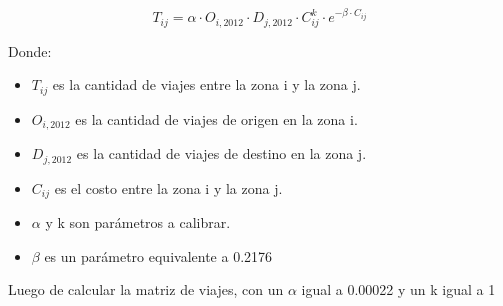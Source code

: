 \documentclass[letterpaper,12pt]{article}
\begin{document}
\begin{equation}
    T_{ij} = \alpha \cdot O_{i,2012} \cdot D_{j,2012} \cdot C_{ij}^k \cdot e^{-\beta \cdot C_{ij}}
\end{equation}

Donde:
\begin{itemize}
    \item $T_{ij}$ es la cantidad de viajes entre la zona i y la zona j.
    \item $O_{i,2012}$ es la cantidad de viajes de origen en la zona i.
    \item $D_{j,2012}$ es la cantidad de viajes de destino en la zona j.
    \item $C_{ij}$ es el costo entre la zona i y la zona j.
    \item $\alpha$ y k son parámetros a calibrar.
    \item $\beta$ es un parámetro equivalente a 0.2176
\end{itemize}


Luego de calcular la matriz de viajes, con un $\alpha$ igual a 0.00022 y un k igual a 1
\end{document}
